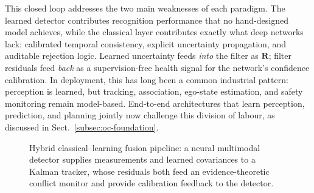 This closed loop addresses the two main weaknesses of each paradigm. The learned detector contributes recognition performance that no hand-designed model achieves, while the classical layer contributes exactly what deep networks lack: calibrated temporal consistency, explicit uncertainty propagation, and auditable rejection logic. Learned uncertainty feeds \emph{into} the filter as $\mathbf{R}$; filter residuals feed \emph{back} as a supervision-free health signal for the network's confidence calibration. In deployment, this has long been a common industrial pattern: perception is learned, but tracking, association, ego-state estimation, and safety monitoring remain model-based. End-to-end architectures that learn perception, prediction, and planning jointly now challenge this division of labour, as discussed in Sect.~\ref{subsec:oc-foundation}.

\begin{figure}[!t]
    \centering
    \caption{Hybrid classical--learning fusion pipeline: a neural multimodal detector supplies measurements and learned covariances to a Kalman tracker, whose residuals both feed an evidence-theoretic conflict monitor and provide calibration feedback to the detector.}
    \label{fig:hybrid-pipeline}
\end{figure}

